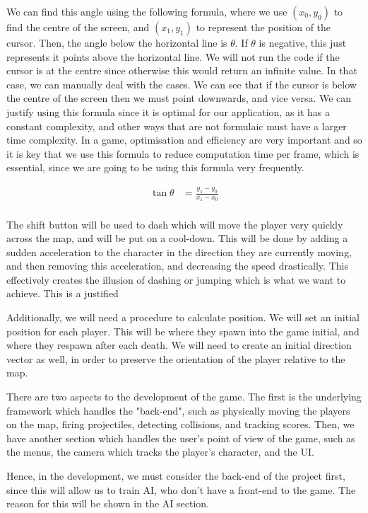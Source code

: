 \vs
We can find this angle using the following formula, where we use $(x_0, y_0)$ to find the centre of the screen, and $(x_1, y_1)$ to represent the position of the cursor. Then, the angle below the horizontal line is $\theta$. If $\theta$ is negative, this just represents it points above the horizontal line. We will not run the code if the cursor is at the centre since otherwise this would return an infinite value. In that case, we can manually deal with the cases. We can see that if the cursor is below the centre of the screen then we must point downwards, and vice versa. We can justify using this formula since it is optimal for our application, as it has a constant complexity, and other ways that are not formulaic must have a larger time complexity. In a game, optimisation and efficiency are very important and so it is key that we use this formula to reduce computation time per frame, which is essential, since we are going to be using this formula very frequently.


\vs
\begin{align*}
    \tan \theta &= \frac{y_1 - y_0}{x_1 - x_0}\\
\end{align*}

\vs
The shift button will be used to dash which will move the player very quickly across the map, and will be put on a cool-down. This will be done by adding a sudden acceleration to the character in the direction they are currently moving, and then removing this acceleration, and decreasing the speed drastically. This effectively creates the illusion of dashing or jumping which is what we want to achieve. This is a justified 
\vs


Additionally, we will need a procedure to calculate position. We will set an initial position for each player. This will be where they spawn into the game initial, and where they respawn after each death. We will need to create an initial direction vector as well, in order to preserve the orientation of the player relative to the map.
\vs


There are two aspects to the development of the game. The first is the underlying framework which handles the "back-end", such as physically moving the players on the map, firing projectiles, detecting collisions, and tracking scores. Then, we have another section which handles the user's point of view of the game, such as the menus, the camera which tracks the player's character, and the UI.
\vs


Hence, in the development, we must consider the back-end of the project first, since this will allow us to train AI, who don't have a front-end to the game. The reason for this will be shown in the AI section.
\vs

